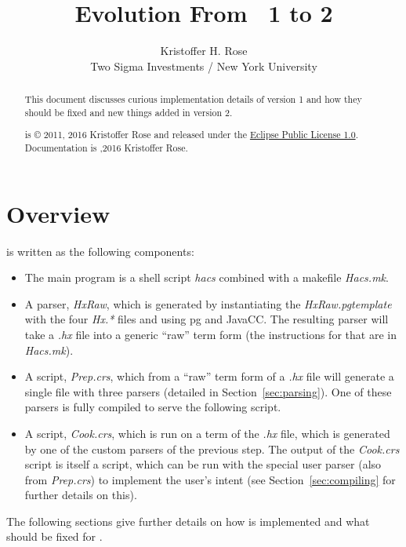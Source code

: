 \documentclass[11pt]{article} %
\title{
  Evolution From \HAX\ 1 to 2
}
\author{
  Kristoffer H. Rose\\
  Two Sigma Investments / New York University
}
\newcommand{\basecopyright}{\noindent
  \HAX is © 2011, 2016 Kristoffer Rose and released under the
  \href{https://www.eclipse.org/legal/epl-v10.html}{Eclipse Public License 1.0}.\\
  \noindent Documentation is \doclicenseImage[imagewidth=3em]
  2011,2016 Kristoffer Rose.}
\newcommand{\documentcopyright}{\basecopyright}
\begin{document}
\maketitle

\begin{abstract}\noindent
  This document discusses curious implementation details of \HAX version 1 and how they should be
  fixed and new things added in \HAX version 2.

  \compacttableofcontents

  \vspace*{2em}\small\color{gray}\noindent%
  \documentcopyright
\end{abstract}


\section{Overview}\label{sec:overview}

 is written as the following components:
\begin{itemize}

\item The main program is a shell script \emph{hacs} combined with a makefile \emph{Hacs.mk}.

\item A parser, \emph{HxRaw}, which is generated by instantiating the \emph{HxRaw.pgtemplate} with
  the four \emph{Hx.*} files and using pg and JavaCC. The resulting parser will take a \emph{.hx}
  file into a generic ``raw''  term form (the instructions for that are in \emph{Hacs.mk}).

\item A  script, \emph{Prep.crs}, which from a ``raw''  term form of a \emph{.hx} file
  will generate a single file with three parsers (detailed in Section~\ref{sec:parsing}). One of
  these parsers is fully compiled to serve the following script.

\item A  script, \emph{Cook.crs}, which is run on a  term of the \emph{.hx} file, which
  is generated by one of the custom parsers of the previous step. The output of the \emph{Cook.crs}
  script is itself a  script, which can be run with the special user parser (also from
  \emph{Prep.crs}) to implement the user's intent (see Section~\ref{sec:compiling} for further
  details on this).

\end{itemize}
The following sections give further details on how  is implemented and what should be fixed for
.
\end{document}
